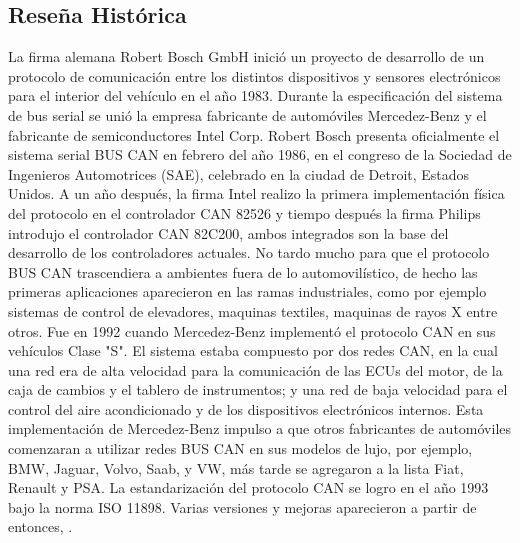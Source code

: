 \subsection {Reseña Histórica}
La firma alemana Robert Bosch GmbH inició un proyecto de desarrollo de un protocolo de comunicación entre los distintos dispositivos y sensores  electrónicos para el interior del vehículo en el año 1983. Durante la especificación del sistema de bus serial se unió la empresa fabricante de automóviles Mercedez-Benz y el fabricante de semiconductores Intel Corp. 
Robert Bosch presenta oficialmente el sistema serial BUS CAN en febrero del año 1986, en el congreso de la Sociedad de Ingenieros Automotrices (SAE), celebrado en la ciudad de Detroit, Estados Unidos.
A un año después, la firma Intel realizo la primera implementación física del protocolo en el controlador CAN 82526 y tiempo después la firma Philips introdujo el controlador CAN 82C200, ambos integrados son la base del desarrollo de los controladores actuales.
No tardo mucho para que el protocolo BUS CAN trascendiera a ambientes fuera de lo automovilístico, de hecho las primeras aplicaciones aparecieron en las ramas industriales, como por ejemplo sistemas de control de elevadores, maquinas textiles, maquinas de rayos X entre otros.
Fue en 1992 cuando Mercedez-Benz implementó el protocolo  CAN en sus vehículos Clase "S". El sistema estaba compuesto por dos redes CAN, en la cual una red era de alta velocidad para la comunicación de las ECUs del motor, de la caja de cambios y el tablero de instrumentos; y una red de baja velocidad para el control del aire acondicionado y de los dispositivos electrónicos internos.  Esta implementación de Mercedez-Benz impulso a que otros fabricantes de automóviles comenzaran a utilizar redes BUS CAN en sus modelos de lujo, por ejemplo, BMW, Jaguar, Volvo, Saab, y VW, más tarde se agregaron a la lista Fiat, Renault y PSA. 
La estandarización del protocolo CAN se logro en el año 1993 bajo la norma ISO 11898. Varias versiones y mejoras aparecieron a partir de entonces, \cite{DSEEPC}.

